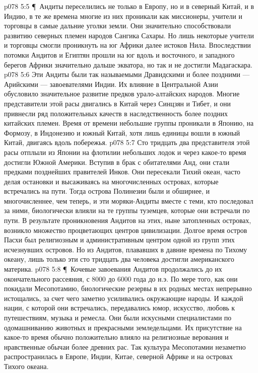 \vs p078 5:5 \P\ Андиты переселились не только в Европу, но и в северный Китай, и в Индию, в те же времена многие из них проникали как миссионеры, учители и торговцы в самые дальние уголки земли. Они значительно способствовали развитию северных племен народов Сангика Сахары. Но лишь некоторые учители и торговцы смогли проникнуть на юг Африки далее истоков Нила. Впоследствии потомки Андитов и Египтян прошли на юг вдоль и восточного, и западного берегов Африки значительно дальше экватора, но так и не достигли Мадагаскара.
\vs p078 5:6 Эти Андиты были так называемыми Дравидскими и более поздними --- Арийскими --- завоевателями Индии. Их влияние в Центральной Азии обусловило значительное развитие предков урало\hyp{}алтайских народов. Многие представители этой расы двигались в Китай через Синцзян и Тибет, и они привнесли ряд положительных качеств в наследственность более поздних китайских племен. Время от времени небольшие группы проникали в Японию, на Формозу, в Индонезию и южный Китай, хотя лишь единицы вошли в южный Китай, двигаясь вдоль побережья.
\vs p078 5:7 Сто тридцать два представителя этой расы отплыли из Японии на флотилии небольших лодок и через какое\hyp{}то время достигли Южной Америки. Вступив в брак с обитателями Анд, они стали предками позднейших правителей Инков. Они пересекали Тихий океан, часто делая остановки и высаживаясь на многочисленных островах, которые встречались на пути. Тогда острова Полинезии были и обширнее, и многочисленнее, чем теперь, и эти моряки\hyp{}Андиты вместе с теми, кто последовал за ними, биологически влияли на те группы туземцев, которые они встречали по пути. В результате проникновения Андитов на этих, ныне затопленных островах, возникло множество процветающих центров цивилизации. Долгое время остров Пасхи был религиозным и административным центром одной из групп этих исчезнувших островов. Но из Андитов, плававших в давние времена по Тихому океану, лишь только эти сто тридцать два человека достигли американского материка.
\vs p078 5:8 \P\ Кочевые завоевания Андитов продолжались до их окончательного рассеяния, с 8000 до 6000 года до н.э. По мере того, как они покидали Месопотамию, биологические резервы в их родных местах непрерывно истощались, за счет чего заметно усиливались окружающие народы. И каждой нации, с которой они встречались, передавались юмор, искусство, любовь к путешествиям, музыка и ремесла. Они были искусными специалистами по одомашниванию животных и прекрасными земледельцами. Их присутствие на какое\hyp{}то время обычно положительно влияло на религиозные верования и нравственные обычаи более древних рас. Так культура Месопотамии незаметно распространилась в Европе, Индии, Китае, северной Африке и на островах Тихого океана.
